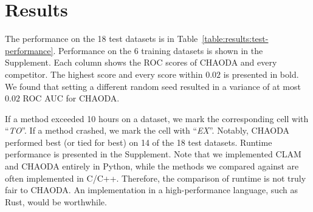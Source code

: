 \section{Results}
\label{sec:results}

The performance on the 18 test datasets is in Table~\ref{table:results:test-performance}.
Performance on the 6 training datasets is shown in the Supplement.
Each column shows the ROC scores of CHAODA and every competitor.
The highest score and every score within $0.02$ is presented in bold.
We found that setting a different random seed resulted in a variance of at most $0.02$ ROC AUC for CHAODA.

If a method exceeded 10 hours on a dataset, we mark the corresponding cell with ``\textit{TO}''.
If a method crashed, we mark the cell with ``\textit{EX}''.
Notably, CHAODA performed best (or tied for best) on 14 of the 18 test datasets.
Runtime performance is presented in the Supplement. 
Note that we implemented CLAM and CHAODA entirely in Python, while the methods we compared against are often implemented in C/C++.
Therefore, the comparison of runtime is not truly fair to CHAODA.
An implementation in a high-performance language, such as Rust, would be worthwhile.

